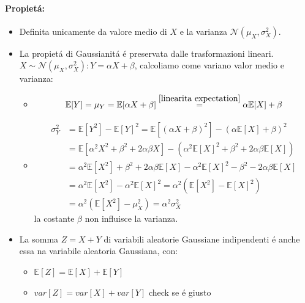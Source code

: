             \paragraph{Propietá:}\label{propieta distr gaussiana}
            \begin{itemize}
                \item {Definita unicamente da valore medio di $X$ e la varianza $\mathcal{N}(\mu_X,\sigma_X^2)$.}
                \item {La propietá di Gaussianitá é preservata dalle trasformazioni lineari. $X \sim \mathcal{N}(\mu_X,\sigma_X^2): Y = \alpha X+\beta$, calcoliamo come variano 
                    valor medio e varianza:
                    \begin{itemize}
                        \item {
                            \[
                                \mathbb{E}[Y] = \mu_Y = \mathbb{E}[\alpha X+\beta]  \overset{\ref{linearita expectation}}{=} \alpha \mathbb{E}[X] + \beta
                            \]
                        }
                        \item {
                            \begin{align}
                                \sigma_Y^2  &= \mathbb{E}[Y^2] -\mathbb{E}[Y]^2 =\mathbb{E}[(\alpha X + \beta)^2] -(\alpha \mathbb{E}[X] + \beta)^2 \nonumber \\
                                            &= \mathbb{E}[\alpha^2 X^2 + \beta^2 +2\alpha\beta X] -(\alpha^2 \mathbb{E}[X]^2 + \beta^2 +2\alpha\beta\mathbb{E}[X])\nonumber \\
                                            &= \alpha^2 \mathbb{E}[X^2] + \beta^2 +2\alpha\beta \mathbb{E}[X] -\alpha^2 \mathbb{E}[X]^2 - \beta^2 -2\alpha\beta\mathbb{E}[X]\nonumber \\
                                            &= \alpha^2 \mathbb{E}[X^2] -\alpha^2 \mathbb{E}[X]^2 = \alpha^2 (\mathbb{E}[X^2] -\mathbb{E}[X]^2)\nonumber \\
                                            &= \alpha^2 (\mathbb{E}[X^2] -\mu_X^2)=\alpha^2 \sigma_X^2\nonumber
                            \end{align}                         
                            la costante $\beta$ non influisce la varianza.  
                        }
                    \end{itemize}}
                \item {La somma $Z = X+Y$ di variabili aleatorie Gaussiane indipendenti é anche essa na variabile aleatoria
                    Gaussiana, con:
                        \begin{itemize}
                            \item {$\mathbb{E}[Z] = \mathbb{E}[X] +\mathbb{E}[Y] $}
                            \item {$var[Z] = var[X] +var[Y] $ check se é giusto}
                        \end{itemize}}
            \end{itemize}
